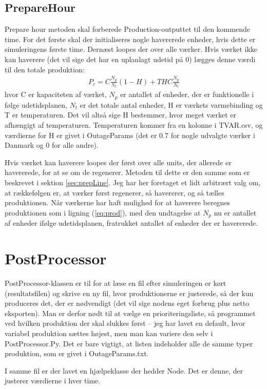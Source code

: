 \documentclass{article}
\begin{document}
\subsection{PrepareHour}
Prepare hour metoden skal forberede Production-outputtet til den kommende time. For det første skal der initialiseres nogle havererede enheder, hvis dette er simuleringens første time. Dernæst loopes der over alle værker. Hvis værket ikke kan haverere (det vil sige det har en uplanlagt udetid på 0) lægges denne værdi til den totale produktion: 
\begin{align} \label{eq:prod}
    P_c = C \frac{N_p}{N_t} (1-H) + T H C \frac{N_p}{N_t}
\end{align}
hvor C er kapaciteten af værket, $N_p$ er antallet af enheder, der er funktionelle i følge udetidsplanen, $N_t$ er det totale antal enheder, H er værkets varmebinding og T er temperaturen. Det vil altså sige H bestemmer, hvor meget værket er afhængigt af temperaturen. Temperaturen kommer fra en kolonne i TVAR.csv, og værdierne for H er givet i OutageParams (det er 0.7 for nogle udvalgte værker i Danmark og 0 for alle andre). 

Hvis værket kan haverere loopes der først over alle units, der allerede er havererede, for at se om de regenerer. Metoden til dette er den samme som er beskrevet i sektion \ref{sec:prepLine}. Jeg har her foretaget et lidt arbitrært valg om, at rækkefølgen er, at værker først regenerer, så havererer, og så tælles produktionen. Når værkerne har haft mulighed for at haverere beregnes produktionen som i ligning (\ref{eq:prod}), med den undtagelse at $N_p$ nu er antallet af enheder ifølge udetidsplanen, fratrukket antallet af enheder der er havererede. 
\section{PostProcessor}
PostProcessor-klassen er til for at læse en fil efter simuleringen er kørt (resultatsfilen) og skrive en ny fil, hvor produktionerne er justerede, så der kun produceres det, der er nødvendigt (det vil sige nodens eget forbrug plus netto eksporten). Man er derfor nødt til at vælge en prioriteringsliste, så programmet ved hvilken produktion der skal slukkes først -- jeg har lavet en default, hvor variabel produktion sættes højest, men man kan variere den selv i PostProcessor.Py. Det er bare vigtigt, at listen indeholder alle de samme typer produktion, som er givet i OutageParams.txt. 

I samme fil er der lavet en hjælpeklasse der hedder Node. Det er denne, der justerer værdierne i hver time.
\end{document}

